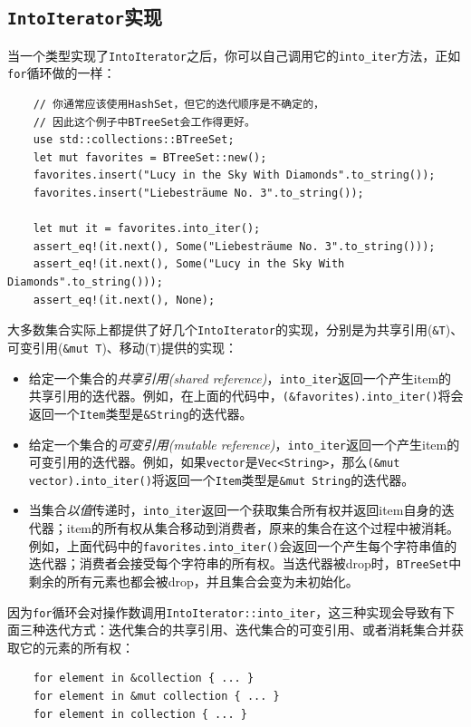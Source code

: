 \subsection{\texttt{IntoIterator}实现}\label{IntoIter}
当一个类型实现了\texttt{IntoIterator}之后，你可以自己调用它的\texttt{into\_iter}方法，正如\texttt{for}循环做的一样：
\begin{verbatim}
    // 你通常应该使用HashSet，但它的迭代顺序是不确定的，
    // 因此这个例子中BTreeSet会工作得更好。
    use std::collections::BTreeSet;
    let mut favorites = BTreeSet::new();
    favorites.insert("Lucy in the Sky With Diamonds".to_string());
    favorites.insert("Liebesträume No. 3".to_string());

    let mut it = favorites.into_iter();
    assert_eq!(it.next(), Some("Liebesträume No. 3".to_string()));
    assert_eq!(it.next(), Some("Lucy in the Sky With Diamonds".to_string()));
    assert_eq!(it.next(), None);
\end{verbatim}

大多数集合实际上都提供了好几个\texttt{IntoIterator}的实现，分别是为共享引用(\texttt{\&T})、可变引用(\texttt{\&mut T})、移动(\texttt{T})提供的实现：
\begin{itemize}
    \item 给定一个集合的\emph{共享引用(shared reference)}，\texttt{into\_iter}返回一个产生item的共享引用的迭代器。例如，在上面的代码中，\texttt{(\&favorites).into\_iter()}将会返回一个\texttt{Item}类型是\texttt{\&String}的迭代器。
    \item 给定一个集合的\emph{可变引用(mutable reference)}，\texttt{into\_iter}返回一个产生item的可变引用的迭代器。例如，如果\texttt{vector}是\texttt{Vec<String>}，那么\texttt{(\&mut vector).into\_iter()}将返回一个\texttt{Item}类型是\texttt{\&mut String}的迭代器。
    \item 当集合\emph{以值}传递时，\texttt{into\_iter}返回一个获取集合所有权并返回item自身的迭代器；item的所有权从集合移动到消费者，原来的集合在这个过程中被消耗。例如，上面代码中的\texttt{favorites.into\_iter()}会返回一个产生每个字符串值的迭代器；消费者会接受每个字符串的所有权。当迭代器被drop时，\texttt{BTreeSet}中剩余的所有元素也都会被drop，并且集合会变为未初始化。
\end{itemize}

因为\texttt{for}循环会对操作数调用\texttt{IntoIterator::into\_iter}，这三种实现会导致有下面三种迭代方式：迭代集合的共享引用、迭代集合的可变引用、或者消耗集合并获取它的元素的所有权：
\begin{verbatim}
    for element in &collection { ... }
    for element in &mut collection { ... }
    for element in collection { ... }
\end{verbatim}

